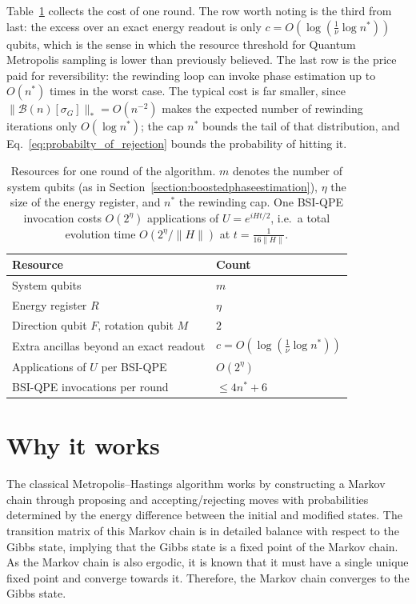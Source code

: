\documentclass[aps,floatfix,10pt,amssymb,amsfont,amsmath,superscriptaddress,float,nofootinbib,longbibliography,nobalancelastpage,twocolumn]{revtex4-2}
\begin{document}
Table~\ref{tab:resources} collects the cost of one round. The row worth noting is the third from last: the excess over an exact energy readout is only $c = O(\log(\frac{1}{\nu}\log n^*))$ qubits, which is the sense in which the resource threshold for Quantum Metropolis sampling is lower than previously believed. The last row is the price paid for reversibility: the rewinding loop can invoke phase estimation up to $O(n^*)$ times in the worst case. The typical cost is far smaller, since $\|\mathcal{B}(n)[\sigma_G]\|_* = O(n^{-2})$ makes the expected number of rewinding iterations only $O(\log n^*)$; the cap $n^*$ bounds the tail of that distribution, and Eq.~\eqref{eq:probabilty_of_rejection} bounds the probability of hitting it.

\begin{table}[b]
\caption{Resources for one round of the algorithm. $m$ denotes the number of system qubits (as in Section~\ref{section:boostedphaseestimation}), $\eta$ the size of the energy register, and $n^*$ the rewinding cap. One BSI-QPE invocation costs $O(2^{\eta})$ applications of $U=e^{iHt/2}$, i.e.\ a total evolution time $O(2^{\eta}/\|H\|)$ at $t=\frac{1}{16\|H\|}$.}
\label{tab:resources}
\begin{ruledtabular}
\begin{tabular}{ll}
Resource & Count \\
\hline
System qubits & $m$ \\
Energy register $R$ & $\eta$ \\
Direction qubit $F$, rotation qubit $M$ & $2$ \\
Extra ancillas beyond an exact readout & $c = O(\log(\frac{1}{\nu}\log n^*))$ \\
Applications of $U$ per BSI-QPE & $O(2^{\eta})$ \\
BSI-QPE invocations per round & $\leq 4n^*+6$ \\
\end{tabular}
\end{ruledtabular}
\end{table}



\label{section:rejection}

\section{Why it works}
\label{section:why}
The classical Metropolis--Hastings algorithm works by constructing a Markov chain through proposing and accepting/rejecting moves with probabilities determined by the energy difference between the initial and modified states. The transition matrix of this Markov chain is in detailed balance with respect to the Gibbs state, implying that the Gibbs state is a fixed point of the Markov chain. As the Markov chain is also ergodic, it is known that it must have a single unique fixed point and converge towards it. Therefore, the Markov chain converges to the Gibbs state.
\end{document}
